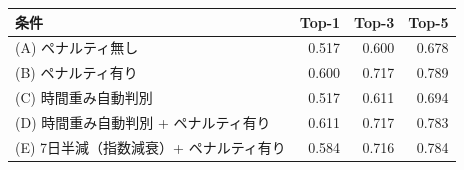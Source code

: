 \begin{tabular}{l r r r}
\hline
条件 & Top-1 & Top-3 & Top-5 \\
\hline
(A) ペナルティ無し & 0.517 & 0.600 & 0.678 \\
(B) ペナルティ有り & 0.600 & 0.717 & 0.789 \\
(C) 時間重み自動判別 & 0.517 & 0.611 & 0.694 \\
(D) 時間重み自動判別 + ペナルティ有り & 0.611 & 0.717 & 0.783 \\
(E) 7日半減（指数減衰）+ ペナルティ有り & 0.584 & 0.716 & 0.784 \\
\hline
\end{tabular}

